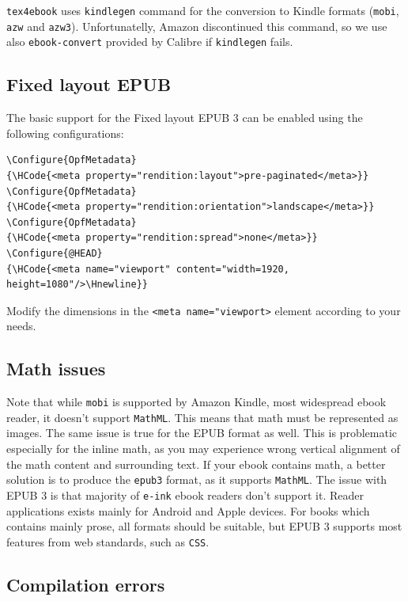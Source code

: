 \texttt{tex4ebook} uses \texttt{kindlegen} command for the conversion to
Kindle formats (\texttt{mobi}, \texttt{azw} and \texttt{azw3}).
Unfortunatelly, Amazon discontinued this command, so we use also
\texttt{ebook-convert} provided by Calibre if \texttt{kindlegen} fails.

\hypertarget{fixed-layout-epub}{%
\subsection{Fixed layout EPUB}\label{fixed-layout-epub}}

The basic support for the Fixed layout EPUB 3 can be enabled using the
following configurations:

\begin{verbatim}
\Configure{OpfMetadata}
{\HCode{<meta property="rendition:layout">pre-paginated</meta>}}
\Configure{OpfMetadata}
{\HCode{<meta property="rendition:orientation">landscape</meta>}}
\Configure{OpfMetadata}
{\HCode{<meta property="rendition:spread">none</meta>}}
\Configure{@HEAD}
{\HCode{<meta name="viewport" content="width=1920, height=1080"/>\Hnewline}}
\end{verbatim}

Modify the dimensions in the
\texttt{\textless{}meta\ name="viewport\textgreater{}} element according
to your needs.

\hypertarget{math-issues}{%
\subsection{Math issues}\label{math-issues}}

Note that while \texttt{mobi} is supported by Amazon Kindle, most
widespread ebook reader, it doesn't support \texttt{MathML}. This means
that math must be represented as images. The same issue is true for the
EPUB format as well. This is problematic especially for the inline math,
as you may experience wrong vertical alignment of the math content and
surrounding text. If your ebook contains math, a better solution is to
produce the \texttt{epub3} format, as it supports \texttt{MathML}. The
issue with EPUB 3 is that majority of \texttt{e-ink} ebook readers don't
support it. Reader applications exists mainly for Android and Apple
devices. For books which contains mainly prose, all formats should be
suitable, but EPUB 3 supports most features from web standards, such as
\texttt{CSS}.

\hypertarget{compilation-errors}{%
\subsection{Compilation errors}\label{compilation-errors}}

